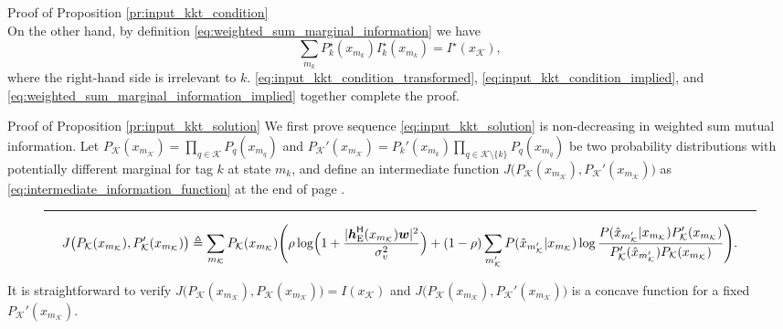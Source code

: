 \documentclass[journal]{IEEEtran}
\begin{document}
\begin{appendix}
\begin{subsection}{Proof of Proposition \ref{pr:input_kkt_condition}}
\begin{equation}
			\label{eq:input_kkt_condition_implied}
		\end{equation}
		On the other hand, by definition \eqref{eq:weighted_sum_marginal_information} we have
		\begin{equation}
			\sum_{m_k} P_k^\star(x_{m_k}) I_k^\star(x_{m_k}) = I^\star(x_{\mathcal{K}}),
			\label{eq:weighted_sum_marginal_information_implied}
		\end{equation}
		where the right-hand side is irrelevant to $k$.
		\eqref{eq:input_kkt_condition_transformed}, \eqref{eq:input_kkt_condition_implied}, and \eqref{eq:weighted_sum_marginal_information_implied} together complete the proof.
		\label{ap:input_kkt_condition}
	\end{subsection}

	\begin{subsection}{Proof of Proposition \ref{pr:input_kkt_solution}}
		We first prove sequence \eqref{eq:input_kkt_solution} is non-decreasing in weighted sum mutual information.
		Let $P_{\mathcal{K}}(x_{m_{\mathcal{K}}}) = \prod_{q \in \mathcal{K}} P_q(x_{m_q})$ and $P_{\mathcal{K}}'(x_{m_{\mathcal{K}}}) = P_k'(x_{m_k}) \prod_{q \in \mathcal{K} \setminus \{k\}} P_q(x_{m_q})$ be two probability distributions with potentially different marginal for tag $k$ at state $m_k$, and define an intermediate function $J \bigl( P_{\mathcal{K}}(x_{m_{\mathcal{K}}}),P_{\mathcal{K}}'(x_{m_{\mathcal{K}}}) \bigr)$ as \eqref{eq:intermediate_information_function} at the end of page \pageref{eq:intermediate_information_function}.
		\begin{figure*}[!b]
			\hrule
			\begin{equation}
				J \bigl( P_{\mathcal{K}}(x_{m_{\mathcal{K}}}),P_{\mathcal{K}}'(x_{m_{\mathcal{K}}}) \bigr) \triangleq \sum_{m_{\mathcal{K}}} P_{\mathcal{K}}(x_{m_{\mathcal{K}}})
				\Biggl( \rho \log \Bigl(1 + \frac{\lvert \boldsymbol{h}_{\text{E}}^\mathsf{H}(x_{m_{\mathcal{K}}}) \boldsymbol{w} \rvert^2}{\sigma_v^2}\Bigr) + (1 - \rho) \sum_{m_{\mathcal{K}}'} P(\hat{x}_{m_{\mathcal{K}}'}|x_{m_{\mathcal{K}}}) \log \frac{P(\hat{x}_{m_{\mathcal{K}}'}|x_{m_{\mathcal{K}}}) P_{\mathcal{K}}'(x_{m_{\mathcal{K}}})}{P_{\mathcal{K}}'(\hat{x}_{m_{\mathcal{K}}'}) P_{\mathcal{K}}(x_{m_{\mathcal{K}}})} \Biggr).
				\label{eq:intermediate_information_function}
			\end{equation}
		\end{figure*}
		It is straightforward to verify $J \bigl( P_{\mathcal{K}}(x_{m_{\mathcal{K}}}),P_{\mathcal{K}}(x_{m_{\mathcal{K}}}) \bigr) = I(x_{\mathcal{K}})$ and $J \bigl( P_{\mathcal{K}}(x_{m_{\mathcal{K}}}),P_{\mathcal{K}}'(x_{m_{\mathcal{K}}}) \bigr)$ is a concave function for a fixed $P_{\mathcal{K}}'(x_{m_{\mathcal{K}}})$.

\end{subsection}
\end{appendix}
\end{document}
